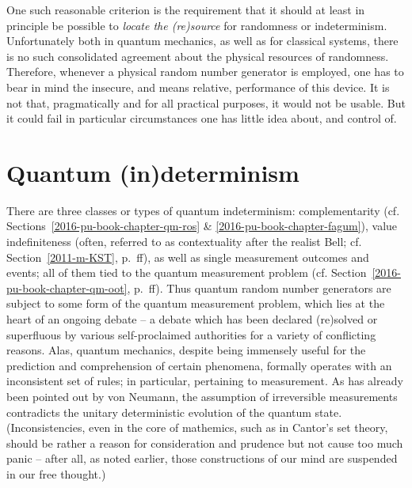 One such reasonable criterion is the requirement that it
should at least in principle be possible to {\em locate the (re)source} for randomness or indeterminism.
Unfortunately both in quantum mechanics, as well as for classical systems,
there is no such consolidated agreement about the physical resources of randomness.
Therefore, whenever a physical random number generator is employed,
one has to bear in mind the insecure, and means relative, performance of this device.
It is not that, pragmatically and for all practical purposes, it would not be usable.
But it could fail in particular circumstances one has little idea about, and control of.

\section{Quantum (in)determinism}

There are three classes or types of quantum indeterminism: complementarity
(cf. Sections~\ref{2016-pu-book-chapter-qm-ros} {\&} \ref{2016-pu-book-chapter-fagum}),
value indefiniteness
(often, referred to as contextuality after the realist Bell; cf. Section~\ref{2011-m-KST}, p.~\pageref{2011-m-KST}ff),
as well as single measurement outcomes and events;
all of them  tied to the quantum measurement problem (cf. Section~\ref{2016-pu-book-chapter-qm-oot}, p.~\pageref{2016-pu-book-chapter-qm-oot}ff).
Thus quantum random number generators are subject to some form of the quantum measurement problem,
which lies at the heart of an ongoing debate -- a debate which has been declared (re)solved or superfluous
by various self-proclaimed authorities for a variety of conflicting reasons.
Alas, quantum mechanics,
despite being immensely useful for the prediction and comprehension of certain phenomena,
formally operates with an inconsistent set of rules; in particular, pertaining to measurement.
As has already been pointed out by von Neumann,
the assumption of  irreversible measurements contradicts the unitary deterministic evolution of the quantum state.
(Inconsistencies, even in the core of mathemics, such as in Cantor's set theory, should be rather a reason for consideration
and prudence but not cause
too much panic -- after all, as noted earlier, those constructions of our mind are suspended in our free thought.)

